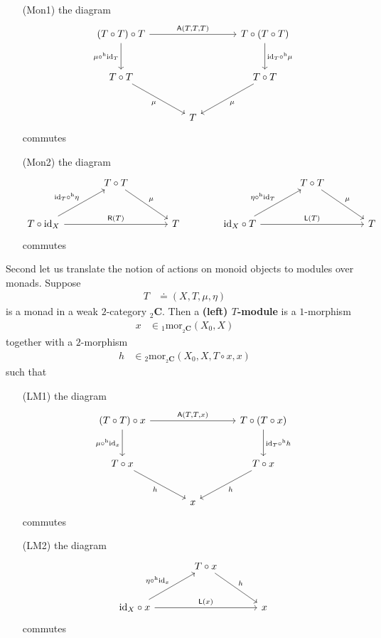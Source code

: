\begin{enumerate}
\item[(Mon1)]
the diagram
\[
\begin{tikzcd}[sep=large]
  \left(
    T
    \circ
    T
  \right)
  \circ
  T
  \arrow{rr}{\mathsf{A}(T,T,T)}
  \arrow[swap]{d}{\mu \circ^{\textrm{h}} \mathrm{id}_{T}}
  &
  &
  T
  \circ
  \left(
    T
    \circ
    T
  \right)
  \arrow{d}{\mathrm{id}_{T} \circ^{\textrm{h}} \mu}
  \\
  T
  \circ
  T
  \arrow[swap]{dr}{\mu}
  &
  &
  T
  \circ
  T
  \arrow{dl}{\mu}
  \\
  &
  T
  &
\end{tikzcd}
\]
commutes
\item[(Mon2)]
the diagram
\[
\begin{tikzcd}[sep=large]
  &
  T
  \circ
  T
  \arrow{dr}{\mu}
  &
  &
  &
  T
  \circ
  T
  \arrow{dr}{\mu}
  &
  \\
  T
  \circ
  \mathrm{id}_{X}
  \arrow{ur}{\mathrm{id}_{T} \circ^{\textrm{h}} \eta}
  \arrow{rr}{\mathsf{R}(T)}
  &
  &
  T
  &
  \mathrm{id}_{X}
  \circ
  T
  \arrow{ur}{\eta \circ^{\textrm{h}} \mathrm{id}_{T}}
  \arrow{rr}{\mathsf{L}(T)}
  &
  &
  T
\end{tikzcd}
\]
commutes
\end{enumerate}
Second let us translate the notion of actions on monoid objects to modules over monads. Suppose
\begin{align*}
  T
  &\doteq
  (X,T,\mu,\eta)
\end{align*}
is a monad in a weak $2$-category ${}_{2}\mathbf{C}$. Then a \textbf{(left) $T$-module} is a $1$-morphism
\begin{align*}
  x
  &\in
  {}_{1}\mathrm{mor}_{{}_{2}\mathbf{C}}(X_{0},X)
\end{align*}
together with a $2$-morphism
\begin{align*}
  h
  &\in
  {}_{2}\mathrm{mor}_{{}_{2}\mathbf{C}}
  \left(
    X_{0},
    X,
    T
    \circ
    x,
    x
  \right)
\end{align*}
such that
\begin{enumerate}
\item[(LM1)]
the diagram
\[
\begin{tikzcd}[sep=large]
  \left(
    T
    \circ
    T
  \right)
  \circ
  x
  \arrow{rr}{\mathsf{A}(T,T,x)}
  \arrow[swap]{d}{\mu \circ^{\textrm{h}} \mathrm{id}_{x}}
  &
  &
  T
  \circ
  \left(
    T
    \circ
    x
  \right)
  \arrow{d}{\mathrm{id}_{T} \circ^{\textrm{h}} h}
  \\
  T
  \circ
  x
  \arrow[swap]{dr}{h}
  &
  &
  T
  \circ
  x
  \arrow{dl}{h}
  \\
  &
  x
  &
\end{tikzcd}
\]
commutes
\item[(LM2)]
the diagram
\[
\begin{tikzcd}[sep=large]
  &
  T
  \circ
  x
  \arrow{dr}{h}
  &
  \\
  \mathrm{id}_{X}
  \circ
  x
  \arrow{ur}{\eta \circ^{\textrm{h}} \mathrm{id}_{x}}
  \arrow{rr}{\mathsf{L}(x)}
  &
  &
  x
\end{tikzcd}
\]
commutes
\end{enumerate}
